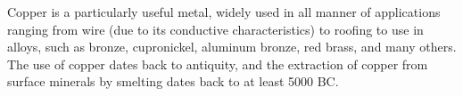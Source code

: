

Copper is a particularly useful metal, widely used in all manner of applications
ranging from wire (due to its conductive characteristics) to roofing to use in
alloys, such as bronze, cupronickel, aluminum bronze, red brass, and many
others.  The use of copper dates back to antiquity, and the extraction of copper
from surface minerals by smelting dates back to at least 5000 BC.


